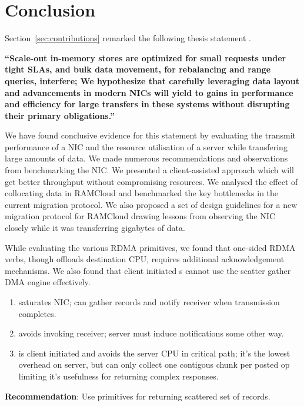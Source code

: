 
\chapter{Conclusion}
\label{chap:conclusion}
Section~\ref{sec:contributions} remarked the following thesis statement .

\textbf{\enquote{Scale-out in-memory stores are optimized for small requests
under tight SLAs, and bulk data movement, for rebalancing and range queries, interfere;
We hypothesize that carefully leveraging data layout and advancements in modern NICs
will yield to gains in performance and efficiency for large transfers in these systems
without disrupting their primary obligations.}}

We have found conclusive evidence for this statement by evaluating the transmit performance 
of a NIC and the resource utilisation of a server while transfering large amounts of data. We 
made numerous recommendations and observations from benchmarking the NIC. We presented a client-assisted 
approach which will get better throughput without compromising resources. We analysed the effect of collocating
data in RAMCloud and benchmarked the key bottlenecks in the current migration protocol. We also proposed a set of design 
guidelines for a new migration protocol for RAMCloud drawing lessons from observing the NIC closely while it was 
transferring gigabytes of data. 

While evaluating the various RDMA primitives, we found that one-sided RDMA verbs, though offloads destination CPU, 
requires additional acknowledgement mechanisms. We also found that client initiated s cannot use the 
scatter gather DMA engine effectively.
  \begin{enumerate}
 \item {} saturates NIC; can gather records and notify receiver when transmission completes.
 \item {} avoids invoking receiver; server must induce notifications some other way.
 \item {} is client initiated and avoids the server CPU in critical path; it's the lowest overhead on server,
  but can only collect one contigous chunk per posted op limiting it's usefulness for returning complex responses.
  \end{enumerate}
  \textbf{Recommendation}: Use  primitives for returning scattered set of records.

